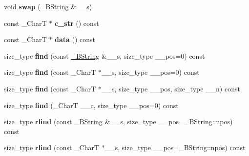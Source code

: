 \begin{DoxyCompactItemize}
\hyperlink{interfacevoid}{void} {\bfseries swap} (\hyperlink{classbasic__string}{\+\_\+\+B\+String} \&\+\_\+\+\_\+s)
\item 
\mbox{\label{class____bstr__sum_a763ed173c39037fcec95f73f7d56d6cb}} 
const \+\_\+\+CharT $\ast$ {\bfseries c\+\_\+str} () const
\item 
\mbox{\label{class____bstr__sum_a9023e490f31d4bd66d230639dd3a7fc1}} 
const \+\_\+\+CharT $\ast$ {\bfseries data} () const
\item 
\mbox{\label{class____bstr__sum_ac2ea9bf289ec8454a809509ad77bfa66}} 
size\+\_\+type {\bfseries find} (const \hyperlink{classbasic__string}{\+\_\+\+B\+String} \&\+\_\+\+\_\+s, size\+\_\+type \+\_\+\+\_\+pos=0) const
\item 
\mbox{\label{class____bstr__sum_a952f7994b913d69e01b9ab76a2358a62}} 
size\+\_\+type {\bfseries find} (const \+\_\+\+CharT $\ast$\+\_\+\+\_\+s, size\+\_\+type \+\_\+\+\_\+pos=0) const
\item 
\mbox{\label{class____bstr__sum_abf1af6dcca9bc8c9c55358b3313e50d6}} 
size\+\_\+type {\bfseries find} (const \+\_\+\+CharT $\ast$\+\_\+\+\_\+s, size\+\_\+type \+\_\+\+\_\+pos, size\+\_\+type \+\_\+\+\_\+n) const
\item 
\mbox{\label{class____bstr__sum_a55a334c03e6f1a5d7364adb7ccb9d500}} 
size\+\_\+type {\bfseries find} (\+\_\+\+CharT \+\_\+\+\_\+c, size\+\_\+type \+\_\+\+\_\+pos=0) const
\item 
\mbox{\label{class____bstr__sum_a1b0be4b8db82ce1e0d496140a7ad92a6}} 
size\+\_\+type {\bfseries rfind} (const \hyperlink{classbasic__string}{\+\_\+\+B\+String} \&\+\_\+\+\_\+s, size\+\_\+type \+\_\+\+\_\+pos=\+\_\+\+B\+String\+::npos) const
\item 
\mbox{\label{class____bstr__sum_a942ab4b9deda0e96479ed98c160b0140}} 
size\+\_\+type {\bfseries rfind} (const \+\_\+\+CharT $\ast$\+\_\+\+\_\+s, size\+\_\+type \+\_\+\+\_\+pos=\+\_\+\+B\+String\+::npos) const
\item 
\mbox{\label{class____bstr__sum_ae5bcd03fb835a528db1b455b708715ca}} 

\end{DoxyCompactItemize}

